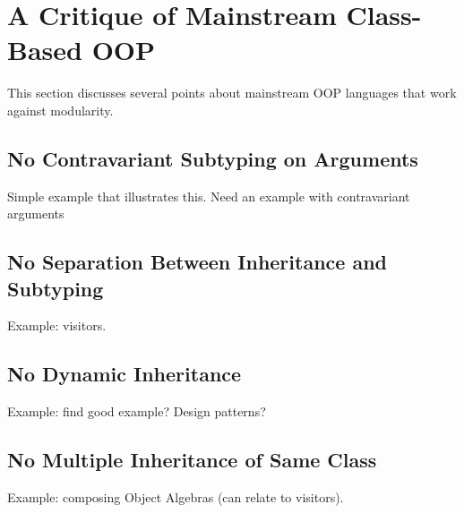 \section{A Critique of Mainstream Class-Based OOP}

This section discusses several points about mainstream OOP languages
that work against modularity. 

\subsection{No Contravariant Subtyping on Arguments}

Simple example that illustrates this. Need an example with contravariant arguments

\subsection{No Separation Between Inheritance and Subtyping}

Example: visitors. 

\subsection{No Dynamic Inheritance}

Example: find good example? Design patterns?

\subsection{No Multiple Inheritance of Same Class}

Example: composing Object Algebras (can relate to visitors).